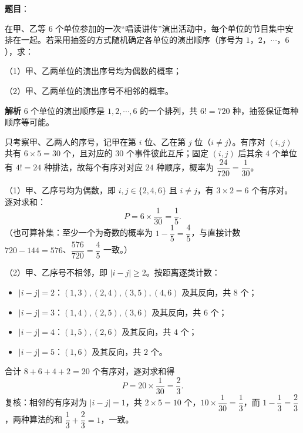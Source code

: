 \begin{answer}

\textbf{题目}：

在甲、乙等 $6$ 个单位参加的一次“唱读讲传”演出活动中，每个单位的节目集中安排在一起。若采用抽签的方式随机确定各单位的演出顺序（序号为 $1$，$2$，$\cdots$，$6$），求：

（1）甲、乙两单位的演出序号均为偶数的概率；

（2）甲、乙两单位的演出序号不相邻的概率。

\textbf{解析}
$6$ 个单位的演出顺序是 $1,2,\cdots,6$ 的一个排列，共 $6!=720$ 种，抽签保证每种顺序等可能。

只考察甲、乙两人的序号，记甲在第 $i$ 位、乙在第 $j$ 位（$i\neq j$）。有序对 $(i,j)$ 共有 $6\times5=30$ 个，且对应的 $30$ 个事件彼此互斥；固定 $(i,j)$ 后其余 $4$ 个单位有 $4!=24$ 种排法，故每个有序对对应 $24$ 种顺序，概率为 $\dfrac{24}{720}=\dfrac1{30}$。

（1）甲、乙序号均为偶数，即 $i,j\in\{2,4,6\}$ 且 $i\neq j$，有 $3\times2=6$ 个有序对。逐对求和：
\nopagebreak[4]
\[P=6\times\frac1{30}=\frac15.\]
（也可算补集：至少一个为奇数的概率为 $1-\dfrac15=\dfrac45$，与直接计数 $720-144=576$、$\dfrac{576}{720}=\dfrac45$ 一致。）

（2）甲、乙序号不相邻，即 $|i-j|\geqslant2$。按距离逐类计数：
\begin{itemize}
\item $|i-j|=2$：$(1,3),(2,4),(3,5),(4,6)$ 及其反向，共 $8$ 个；
\item $|i-j|=3$：$(1,4),(2,5),(3,6)$ 及其反向，共 $6$ 个；
\item $|i-j|=4$：$(1,5),(2,6)$ 及其反向，共 $4$ 个；
\item $|i-j|=5$：$(1,6)$ 及其反向，共 $2$ 个。
\end{itemize}

合计 $8+6+4+2=20$ 个有序对，逐对求和得
\nopagebreak[4]
\[P=20\times\frac1{30}=\frac23.\]
复核：相邻的有序对为 $|i-j|=1$，共 $2\times5=10$ 个，$10\times\dfrac1{30}=\dfrac13$，而 $1-\dfrac13=\dfrac23$，两种算法的和 $\dfrac13+\dfrac23=1$，一致。


\end{answer}
